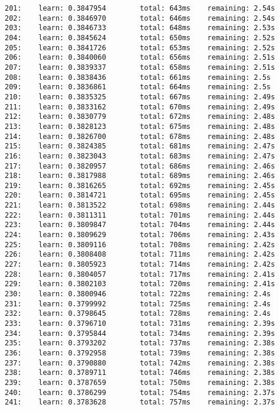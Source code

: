 \documentclass[11pt]{article}
\begin{document}
\begin{Verbatim}[commandchars=\\\{\}]
201:    learn: 0.3847954        total: 643ms    remaining: 2.54s
202:    learn: 0.3846970        total: 646ms    remaining: 2.54s
203:    learn: 0.3846733        total: 648ms    remaining: 2.53s
204:    learn: 0.3845624        total: 650ms    remaining: 2.52s
205:    learn: 0.3841726        total: 653ms    remaining: 2.52s
206:    learn: 0.3840060        total: 656ms    remaining: 2.51s
207:    learn: 0.3839337        total: 658ms    remaining: 2.51s
208:    learn: 0.3838436        total: 661ms    remaining: 2.5s
209:    learn: 0.3836861        total: 664ms    remaining: 2.5s
210:    learn: 0.3835325        total: 667ms    remaining: 2.49s
211:    learn: 0.3833162        total: 670ms    remaining: 2.49s
212:    learn: 0.3830779        total: 672ms    remaining: 2.48s
213:    learn: 0.3828123        total: 675ms    remaining: 2.48s
214:    learn: 0.3826700        total: 678ms    remaining: 2.48s
215:    learn: 0.3824385        total: 681ms    remaining: 2.47s
216:    learn: 0.3823043        total: 683ms    remaining: 2.47s
217:    learn: 0.3820957        total: 686ms    remaining: 2.46s
218:    learn: 0.3817988        total: 689ms    remaining: 2.46s
219:    learn: 0.3816265        total: 692ms    remaining: 2.45s
220:    learn: 0.3814721        total: 695ms    remaining: 2.45s
221:    learn: 0.3813522        total: 698ms    remaining: 2.44s
222:    learn: 0.3811311        total: 701ms    remaining: 2.44s
223:    learn: 0.3809847        total: 704ms    remaining: 2.44s
224:    learn: 0.3809629        total: 706ms    remaining: 2.43s
225:    learn: 0.3809116        total: 708ms    remaining: 2.42s
226:    learn: 0.3808408        total: 711ms    remaining: 2.42s
227:    learn: 0.3805923        total: 714ms    remaining: 2.42s
228:    learn: 0.3804057        total: 717ms    remaining: 2.41s
229:    learn: 0.3802103        total: 720ms    remaining: 2.41s
230:    learn: 0.3800946        total: 722ms    remaining: 2.4s
231:    learn: 0.3799992        total: 725ms    remaining: 2.4s
232:    learn: 0.3798645        total: 728ms    remaining: 2.4s
233:    learn: 0.3796710        total: 731ms    remaining: 2.39s
234:    learn: 0.3795844        total: 734ms    remaining: 2.39s
235:    learn: 0.3793202        total: 737ms    remaining: 2.38s
236:    learn: 0.3792958        total: 739ms    remaining: 2.38s
237:    learn: 0.3790880        total: 742ms    remaining: 2.38s
238:    learn: 0.3789711        total: 746ms    remaining: 2.38s
239:    learn: 0.3787659        total: 750ms    remaining: 2.38s
240:    learn: 0.3786299        total: 754ms    remaining: 2.37s
241:    learn: 0.3783628        total: 757ms    remaining: 2.37s

\end{Verbatim}
\end{document}
